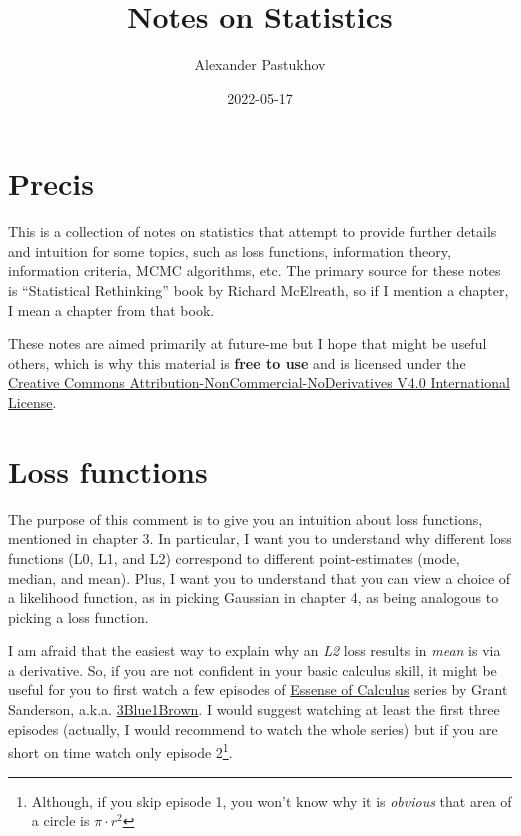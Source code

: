 \documentclass[
]{book}
\title{Notes on Statistics}
\author{Alexander Pastukhov}
\date{2022-05-17}
\begin{document}
\maketitle

{
\setcounter{tocdepth}{1}
\tableofcontents
}
\hypertarget{precis}{%
\chapter{Precis}\label{precis}}

This is a collection of notes on statistics that attempt to provide further details and intuition for some topics, such as loss functions, information theory, information criteria, MCMC algorithms, etc. The primary source for these notes is ``Statistical Rethinking'' book by Richard McElreath, so if I mention a chapter, I mean a chapter from that book.

These notes are aimed primarily at future-me but I hope that might be useful others, which is why this material is \textbf{free to use} and is licensed under the \href{https://creativecommons.org/licenses/by-nc-nd/4.0/}{Creative Commons Attribution-NonCommercial-NoDerivatives V4.0 International License}.

\hypertarget{loss-functions}{%
\chapter{Loss functions}\label{loss-functions}}

The purpose of this comment is to give you an intuition about loss functions, mentioned in chapter 3. In particular, I want you to understand why different loss functions (L0, L1, and L2) correspond to different point-estimates (mode, median, and mean). Plus, I want you to understand that you can view a choice of a likelihood function, as in picking Gaussian in chapter 4, as being analogous to picking a loss function.

I am afraid that the easiest way to explain why an \emph{L2} loss results in \emph{mean} is via a derivative. So, if you are not confident in your basic calculus skill, it might be useful for you to first watch a few episodes of \href{https://www.youtube.com/playlist?list=PLZHQObOWTQDMsr9K-rj53DwVRMYO3t5Yr}{Essense of Calculus} series by Grant Sanderson, a.k.a. \href{https://www.3blue1brown.com/}{3Blue1Brown}. I would suggest watching at least the first three episodes (actually, I would recommend to watch the whole series) but if you are short on time watch only episode 2\footnote{Although, if you skip episode 1, you won't know why it is \emph{obvious} that area of a circle is \(\pi\cdot r^2\)}.
\end{document}
